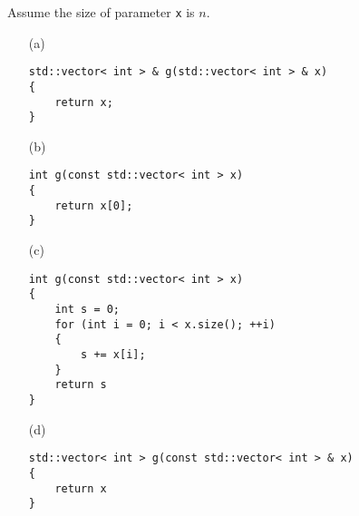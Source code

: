 Assume the size of parameter \verb!x! is $n$.
\begin{enumerate}
\item[(a)]
\begin{Verbatim}[frame=single, fontsize=\small]
std::vector< int > & g(std::vector< int > & x)
{
    return x;
}
\end{Verbatim}
\item[(b)]
\begin{Verbatim}[frame=single, fontsize=\small]
int g(const std::vector< int > x)
{
    return x[0];
}
\end{Verbatim}
\item[(c)]
\begin{Verbatim}[frame=single, fontsize=\small]
int g(const std::vector< int > x)
{
    int s = 0;
    for (int i = 0; i < x.size(); ++i)
    {
        s += x[i];
    }
    return s
}
\end{Verbatim}
\item[(d)]
\begin{Verbatim}[frame=single, fontsize=\small]
std::vector< int > g(const std::vector< int > & x)
{
    return x
}
\end{Verbatim}
\end{enumerate}
